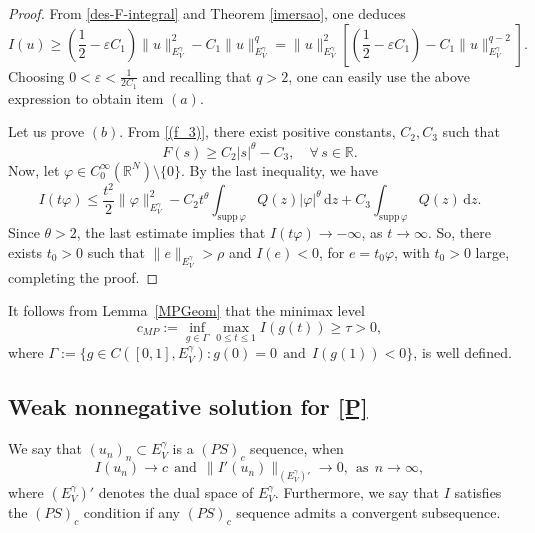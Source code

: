 \documentclass[12pt]{amsart}
\newcommand{\R}{\mathbb{R}}
\begin{document}
\begin{proof}
	From \eqref{des-F-integral} and Theorem \ref{imersao}, one deduces
    $$
	I(u) \geq\left(\frac{1}{2} - \varepsilon C_1\right)\|u\|_{E_V^\gamma}^2  -C_1\|u\|_{E_V^\gamma}^q = \|u\|_{E_V^\gamma}^2\left[\left(\frac{1}{2} - \varepsilon C_1\right) - C_1\|u\|_{E_V^\gamma}^{q-2}\right]. 
	$$
Choosing $0<\varepsilon<\frac{1}{2C_1}$ and recalling that $q>2$, one can easily use the above expression to obtain
	item $(a)$.
    
Let us prove $(b)$. From \ref{(f_3)}, there exist positive constants, $C_2, C_3$ such that
	\begin{equation*}\label{F}
		F(s) \geq C_2|s|^\theta-C_3 , \quad \forall \, s \in \mathbb{R}.
	\end{equation*}
    Now, let $\varphi \in C_0^\infty(\R^N)\setminus\{0\}$. By the last inequality, we have
	$$
	I(t \varphi) \leq\frac{t^2}{2}\|\varphi\|_{E_V^\gamma}^2- C_2t^\theta \int_{\mathrm{supp} \, \varphi} Q(z) |\varphi|^\theta \, \mathrm{d}z + C_3 \int_{\mathrm{supp} \, \varphi} Q(z) \, \mathrm{d}z .
	$$
Since $\theta>2$, the last estimate implies that $I(t\varphi)\rightarrow-\infty$, as $t\rightarrow\infty$. So, there exists $t_0>0$ such that $\|e\|_{E_V^\gamma}>\rho$ and $I(e)<0$, for $e = t_0\varphi$, with $t_0>0$ large, completing the proof.
\end{proof}
    
It follows from Lemma~\ref{MPGeom} that the minimax level
$$
c_{MP}:=\inf_{g\in \Gamma}\max_{0\leq t \leq 1}I(g(t)) \geq \tau>0,
$$
where $\Gamma:=\{g \in C\left([0,1], E_V^\gamma \right): g(0) = 0 \ \ \mbox{and} \ \ I(g(1))<0 \}$, is well defined.

\vspace{0,5cm}

\subsection{Weak nonnegative solution for \eqref{P}}

We say that $(u_n)_n \subset E_V^\gamma$ is a $(PS)_c$ sequence, when
\begin{equation}\label{sc}
	I(u_n) \rightarrow c\ \ \mbox{and} \ \ \|I'(u_n)\|_{(E^\gamma_V)'}\rightarrow0,\ \ \mbox{as}\ \ n\rightarrow\infty,
\end{equation}
where $(E_V^\gamma)'$ denotes the dual
space of $E_V^\gamma$. Furthermore, we say that $I$ satisfies the $(PS)_c$ condition if any $(PS)_c$ sequence admits a convergent subsequence.
\end{document}
